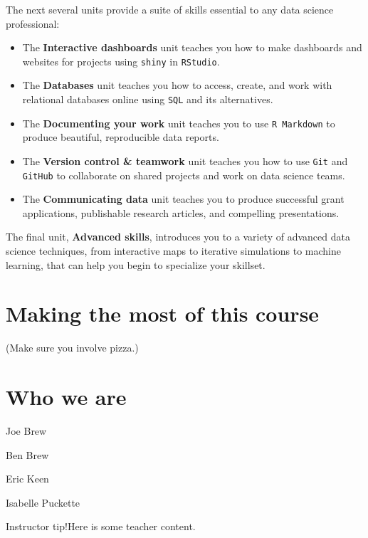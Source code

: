 \documentclass[
]{book}
\begin{document}
The next several units provide a suite of skills essential to any data science professional:

\begin{itemize}
\item
  The \textbf{Interactive dashboards} unit teaches you how to make dashboards and websites for projects using \texttt{shiny} in \texttt{RStudio}.
\item
  The \textbf{Databases} unit teaches you how to access, create, and work with relational databases online using \texttt{SQL} and its alternatives.
\item
  The \textbf{Documenting your work} unit teaches you to use \texttt{R\ Markdown} to produce beautiful, reproducible data reports.
\item
  The \textbf{Version control \& teamwork} unit teaches you how to use \texttt{Git} and \texttt{GitHub} to collaborate on shared projects and work on data science teams.
\item
  The \textbf{Communicating data} unit teaches you to produce successful grant applications, publishable research articles, and compelling presentations.
\end{itemize}

The final unit, \textbf{Advanced skills}, introduces you to a variety of advanced data science techniques, from interactive maps to iterative simulations to machine learning, that can help you begin to specialize your skillset.

\hypertarget{making-the-most-of-this-course}{%
\section*{Making the most of this course}\label{making-the-most-of-this-course}}

(Make sure you involve pizza.)

\hypertarget{who-we-are}{%
\section*{Who we are}\label{who-we-are}}

Joe Brew

Ben Brew

Eric Keen

Isabelle Puckette

Instructor tip!Here is some teacher content.
\end{document}
